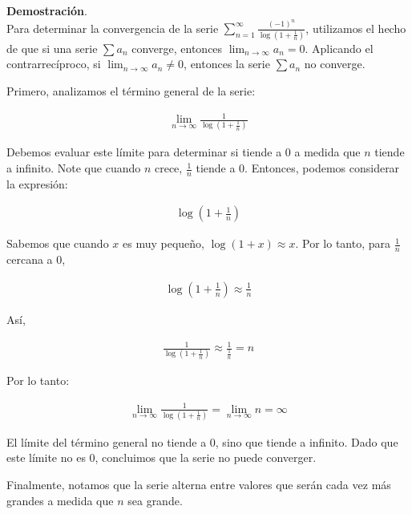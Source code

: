 \documentclass{article}
\begin{document}
    \textbf{Demostración}.\\

    Para determinar la convergencia de la serie $\sum_{n=1}^{\infty} \frac{(-1)^{n}}{\log \left(1+\frac{1}{n}\right)}$, utilizamos el hecho de que si una serie $\sum a_{n}$ converge, entonces $\lim _{n \rightarrow \infty} a_{n}=0$. Aplicando el contrarrecíproco, si $\lim _{n \rightarrow \infty} a_{n} \neq 0$, entonces la serie $\sum a_{n}$ no converge.

    Primero, analizamos el término general de la serie:

    \begin{align*}
    \lim _{n \rightarrow \infty} \frac{1}{\log \left(1+\frac{1}{n}\right)}
    \end{align*}

    Debemos evaluar este límite para determinar si tiende a 0 a medida que \( n \) tiende a infinito. Note que cuando \( n \) crece, \( \frac{1}{n} \) tiende a 0. Entonces, podemos considerar la expresión:

    \begin{align*}
    \log \left(1+\frac{1}{n}\right)
    \end{align*}

    Sabemos que cuando \( x \) es muy pequeño, \( \log(1+x) \approx x \). Por lo tanto, para \( \frac{1}{n} \) cercana a 0,

    \begin{align*}
    \log \left(1+\frac{1}{n}\right) \approx \frac{1}{n}
    \end{align*}

    Así,

    \begin{align*}
    \frac{1}{\log \left(1+\frac{1}{n}\right)} \approx \frac{1}{\frac{1}{n}} = n
    \end{align*}

    Por lo tanto:

    \begin{align*}
    \lim _{n \rightarrow \infty} \frac{1}{\log \left(1+\frac{1}{n}\right)} = \lim _{n \rightarrow \infty} n = \infty
    \end{align*}

    El límite del término general no tiende a 0, sino que tiende a infinito. Dado que este límite no es 0, concluimos que la serie no puede converger.

    Finalmente, notamos que la serie alterna entre valores que serán cada vez más grandes a medida que \( n \) sea grande.
\end{document}
